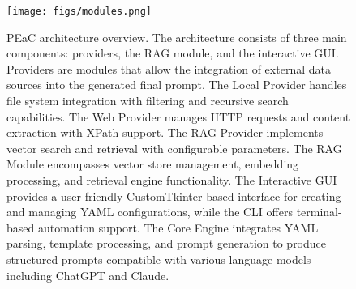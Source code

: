 
\begin{figure}[ht]
    \centering
    \texttt{[image: figs/modules.png]}
    \caption{PEaC architecture overview. The architecture consists of three main components: providers, the RAG module, and the interactive GUI. Providers are modules that allow the integration of external data sources into the generated final prompt. The Local Provider handles file system integration with filtering and recursive search capabilities. The Web Provider manages HTTP requests and content extraction with XPath support. The RAG Provider implements vector search and retrieval with configurable parameters. The RAG Module encompasses vector store management, embedding processing, and retrieval engine functionality. The Interactive GUI provides a user-friendly CustomTkinter-based interface for creating and managing YAML configurations, while the CLI offers terminal-based automation support. The Core Engine integrates YAML parsing, template processing, and prompt generation to produce structured prompts compatible with various language models including ChatGPT and Claude.}
    \label{fig:modules}
\end{figure}

